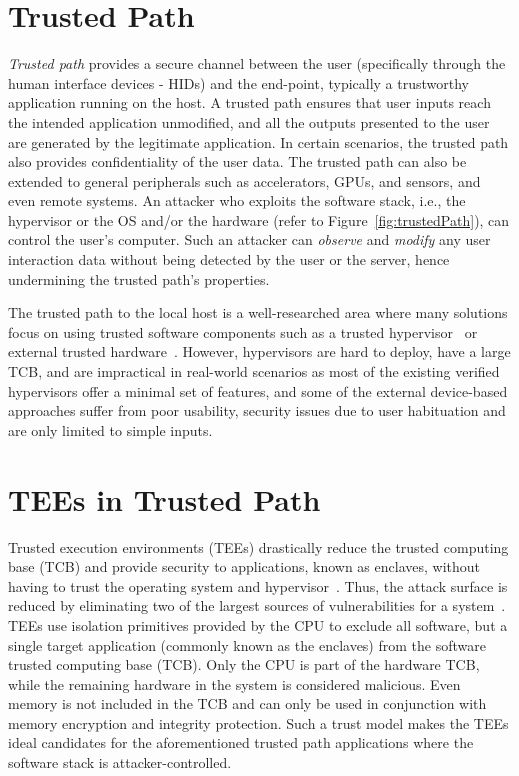 \section{Trusted Path}

\emph{Trusted path} provides a secure channel between the user (specifically through the human interface devices - HIDs) and the end-point, typically a trustworthy application running on the host. A trusted path ensures that user inputs reach the intended application unmodified, and all the outputs presented to the user are generated by the legitimate application. In certain scenarios, the trusted path also provides confidentiality of the user data. The trusted path can also be extended to general peripherals such as accelerators, GPUs, and sensors, and even remote systems. An attacker who exploits the software stack, i.e., the hypervisor or the OS and/or the hardware (refer to Figure~\ref{fig:trustedPath}), can control the user's computer. Such an attacker can \emph{observe} and \emph{modify} any user interaction data without being detected by the user or the server, hence undermining the trusted path's properties. 

The trusted path to the local host is a well-researched area where many solutions focus on using trusted software components such as a trusted hypervisor~\cite{zhou2012building} or external trusted hardware~\cite{filyanov2011uni,weigold2011secure,McCPerRei2006,mannan2007using,Fidelius}. However, hypervisors are hard to deploy, have a large TCB, and are impractical in real-world scenarios as most of the existing verified hypervisors offer a minimal set of features, and some of the external device-based approaches suffer from poor usability, security issues due to user habituation and are only limited to simple inputs.


\section{TEEs in Trusted Path}

Trusted execution environments (TEEs) drastically reduce the trusted computing base (TCB) and provide security to applications, known as enclaves, without having to trust the operating system and hypervisor~\cite{costan2016intel,winter2008trusted,costan2016sanctum}. Thus, the attack surface is reduced by eliminating two of the largest sources of vulnerabilities for a system~\cite{checkoway2013iago,suzaki2011memory}. TEEs use isolation primitives provided by the CPU to exclude all software, but a single target application (commonly known as the enclaves) from the software trusted computing base (TCB). Only the CPU is part of the hardware TCB, while the remaining hardware in the system is considered malicious. Even memory is not included in the TCB and can only be used in conjunction with memory encryption and integrity protection. Such a trust model makes the TEEs ideal candidates for the aforementioned trusted path applications where the software stack is attacker-controlled. 


